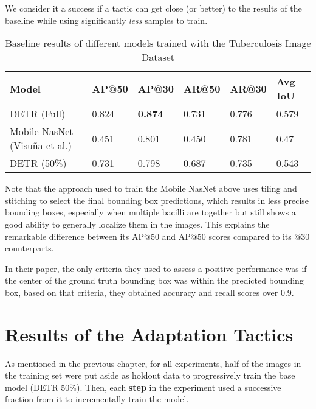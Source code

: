 \documentclass[../main.tex]{subfiles}
\begin{document}
We consider it a success if a tactic can get close (or better) to the results of the baseline while using significantly \textit{less} samples to train.


\begin{table}[h!]
\caption{Baseline results of different models trained with the Tuberculosis Image Dataset}
\label{tab:eval_metrics}
\begin{tabular}{llllll}
\toprule
Model & AP@50 & \textbf{AP@30} & AR@50 & AR@30 & Avg IoU \\
\midrule
DETR (Full) & 0.824 & \textbf{0.874} & 0.731 & 0.776 & 0.579 \\
Mobile NasNet (Visuña et al.) & 0.451 & 0.801 & 0.450 & 0.781 & 0.47 \\
DETR (50\%) & 0.731 &	0.798 & 0.687 &	0.735 &	0.543 \\
\bottomrule
\end{tabular}
\end{table}


Note that the approach used to train the Mobile NasNet above uses tiling and stitching to select the final bounding box predictions, which results in less precise bounding boxes, especially when multiple bacilli are together but still shows a good ability to generally localize them in the images. This explains the remarkable difference between its AP@50 and AP@50 scores compared to its @30 counterparts. 

In their paper, the only criteria they used to assess a positive performance was if the center of the ground truth bounding box was within the predicted bounding box, based on that criteria, they obtained accuracy and recall scores over 0.9.



\section{Results of the Adaptation Tactics} \label{results:continual_learning}

As mentioned in the previous chapter, for all experiments, half of the images in the training set were put aside as holdout data to progressively train the base model (DETR 50\%). Then, each \textbf{step} in the experiment used a successive fraction from it to incrementally train the model. 
\end{document}
